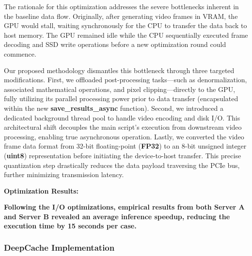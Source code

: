 The rationale for this optimization addresses the severe bottlenecks inherent in the baseline data flow. Originally, after generating video frames in VRAM, the GPU would stall, waiting synchronously for the CPU to transfer the data back to host memory. The GPU remained idle while the CPU sequentially executed frame decoding and SSD write operations before a new optimization round could commence.

Our proposed methodology dismantles this bottleneck through three targeted modifications. First, we offloaded post-processing tasks—such as denormalization, associated mathematical operations, and pixel clipping—directly to the GPU, fully utilizing its parallel processing power prior to data transfer (encapsulated within the new \textbf{save\_results\_async} function). Second, we introduced a dedicated background thread pool to handle video encoding and disk I/O. This architectural shift decouples the main script's execution from downstream video processing, enabling true asynchronous operation. Lastly, we converted the video frame data format from 32-bit floating-point (\textbf{FP32}) to an 8-bit unsigned integer (\textbf{uint8}) representation before initiating the device-to-host transfer. This precise quantization step drastically reduces the data payload traversing the PCIe bus, further minimizing transmission latency.

\textbf{Optimization Results:}

\textbf{Following the I/O optimizations, empirical results from both Server A and Server B revealed an average inference speedup, reducing the execution time by \textbf{15} seconds per case.}

\subsubsection{DeepCache Implementation}
\

